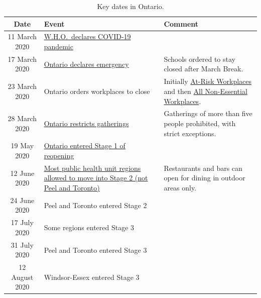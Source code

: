 \documentclass[12pt]{article}\usepackage[]{graphicx}\usepackage[]{color}
\begin{document}
\begin{table}[ht]
\begin{center}
  \RaggedRight
  \renewcommand{\arraystretch}{1.5}
  \small
\begin{tabular}{ c | p{7cm} | p{6cm} }
{\bfseries Date} & {\bfseries Event} & {\bfseries Comment} \\ \hline

11 March 2020 &
                \href{https://www.who.int/dg/speeches/detail/who-director-general-s-opening-remarks-at-the-media-briefing-on-covid-19---11-march-2020}{W.H.O.~declares COVID-19 pandemic} \\
17 March 2020 &
                \href{https://news.ontario.ca/opo/en/2020/03/ontario-enacts-declaration-of-emergency-to-protect-the-public.html}{Ontario
                declares emergency} & Schools ordered to stay
                                            closed after March Break. \\
23 March 2020 & Ontario orders workplaces to close & Initially
                                                    \href{https://news.ontario.ca/opo/en/2020/03/ontario-closing-at-risk-workplaces-to-protect-health-and-safety.html}{At-Risk
                                                    Workplaces} and
                                                    then
\href{https://news.ontario.ca/opo/en/2020/03/ontario-orders-the-mandatory-closure-of-all-non-essential-workplaces-to-fight-spread-of-covid-19.html}{All
                                                    Non-Essential
                                                    Workplaces}. \\

28 March 2020 &
                \href{https://news.ontario.ca/opo/en/2020/03/ontario-prohibits-gatherings-of-five-people-or-more-with-strict-exceptions.html}{Ontario
                restricts gatherings} & Gatherings of more than five
                                        people prohibited, with strict exceptions.\\
19 May 2020 &
              \href{https://www.ontario.ca/page/reopening-ontario-whats-each-stage#section-1}{Ontario
              entered Stage 1 of reopening} & \\
12 June 2020 &
               \href{https://www.ontario.ca/page/reopening-ontario-whats-each-stage#section-2}{Most
               public health unit regions allowed to move into Stage
               2 (not Peel and Toronto)} & Restaurants and bars can open for dining in outdoor areas only.\\
24 June 2020 &  Peel and Toronto entered Stage 2& \\
17 July 2020 &  Some regions entered Stage 3& \\
31 July 2020 &  Peel and Toronto entered Stage 3& \\
12 August 2020 & Windsor-Essex entered Stage 3& \\
\end{tabular}
\end{center}
\caption{Key dates in Ontario.}
\label{tab:dates}
\end{table}
\end{document}
